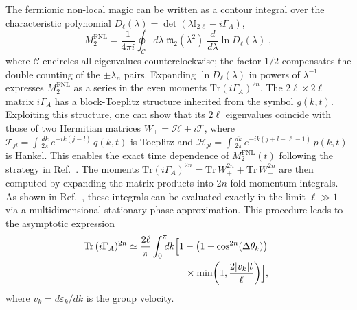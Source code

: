\documentclass[prx,twocolumn,superscriptaddress,aps,10pt, frontmatterverbose, reprint,footinbib,longbibliography=true]{revtex4-2}
\providecommand{\DIFaddend}{\protect\color{black}} %
\begin{document}
The fermionic non-local magic can be written as a contour integral over the characteristic polynomial $D_\ell(\lambda) = \det(\lambda \mathbb{I}_{2\ell} - i\Gamma_A)$,
\begin{equation}
    M_2^{\mathrm{FNL}} = \frac{1}{4\pi i}\oint_\mathcal{C}d\lambda\;\mathfrak{m}_2(\lambda^2)\;\frac{d}{d\lambda}\ln D_\ell(\lambda)\;,\label{eq:circccc}
\end{equation}
where $\mathcal{C}$ encircles all eigenvalues counterclockwise; the factor $1/2$ compensates the double counting of the $\pm\lambda_n$ pairs.
Expanding $\ln D_\ell(\lambda)$ in powers of $\lambda^{-1}$ expresses $M_2^{\mathrm{FNL}}$ as a series in the even moments $\mathrm{Tr}(i\Gamma_A)^{2n}$.
The $2\ell \times 2\ell$ matrix $i\Gamma_A$ has a block-Toeplitz structure inherited from the symbol $g(k,t)$.
Exploiting this structure, one can show that its $2\ell$ eigenvalues coincide with those of two Hermitian matrices $W_\pm = \mathcal{H} \pm i\mathcal{T}$, where $\mathcal{T}_{jl} = \int \frac{dk}{2\pi}\,e^{-ik(j-l)}\,q(k,t)$ is Toeplitz and $\mathcal{H}_{jl} = \int \frac{dk}{2\pi}\,e^{-ik(j+l-\ell-1)}\,p(k,t)$ is Hankel. This enables the exact time dependence of $M_2^\mathrm{FNL}(t)$ following the strategy in Ref.~\cite{Fagotti2008}. 
The moments $\mathrm{Tr}(i\Gamma_A)^{2n} = \mathrm{Tr}\,W_+^{2n} + \mathrm{Tr}\,W_-^{2n}$ are then computed by expanding the matrix products into $2n$-fold momentum integrals.
As shown in Ref.~\cite{Fagotti2008}, these integrals can be evaluated exactly in the limit $\ell \gg 1$ via a multidimensional stationary phase approximation.
This procedure leads to the asymptotic expression\begin{equation}
\begin{split}
   \!\!\! \mathrm{Tr}\,(i\Gamma_A)^{2n}&\simeq \frac{2\ell}{\pi}\int_0^\pi\!\!\!dk\Bigl[1-\bigl(1-\cos^{2n}(\Delta\theta_k)\bigr)\\
   &\qquad\qquad\qquad\times\min\!\left(1, \frac{2|v_k|t}{\ell}\right)\Bigr],
\end{split}
\label{eq:moments_asymptotic}
\end{equation}\DIFaddend 
where $v_k = d\varepsilon_k/dk$ is the group velocity.
\end{document}
